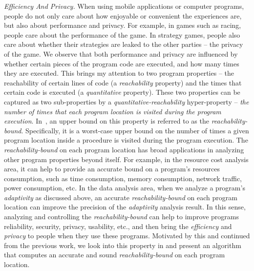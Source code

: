 \emph{Efficiency And Privacy.}
When using mobile applications or computer programs, people do not only care about how enjoyable or convenient the experiences are,
but also about performance and
privacy.
For example, 
in games such as racing, 
people care about the performance of the game.
In 
strategy games, people also care about whether their strategies are leaked to
the other parties -- the privacy of the game.
We observe that both performance and privacy
are influenced by
whether certain pieces of the program code are executed,
and how many times they are executed.
This brings my attention to two program properties -- 
the
reachability of certain lines of code (a \emph{reachability} property) and the times that certain code is executed (a \emph{quantitative} property).
These two properties can be captured as two sub-properties by a \emph{quantitative-reachability} hyper-property
-- \emph{the number of times that each program location is visited during the program execution}.
In~\cite{GulwaniJK09}, an upper bound on this property is referred to as the \emph{reachability-bound}. Specifically, it is a worst-case upper bound on the number of times a given program location 
inside a procedure is visited during the program execution.
The \emph{reachability-bound} on each program location has broad applications in analyzing other program properties beyond itself.
For example, in the resource cost analysis area, 
it
can help to provide an accurate
bound on a program's resources consumption,
such as time consumption, memory consumption,
network traffic, power consumption, etc.
In the data analysis area, when we analyze a program's \emph{adaptivity}
as discussed above,
an accurate \emph{reachability-bound} on each program location
can improve the precision of the \emph{adaptivity} analysis result.
In this sense, analyzing and controlling the \emph{reachability-bound} can help to improve programs reliability, security, privacy, usability, etc., and then bring the
\emph{efficiency} and \emph{privacy} to people when they use these programs.
Motivated by this and continued from 
the previous work, we look into this
property in  and present an algorithm 
that computes an accurate and sound \emph{reachability-bound} on each program location.



